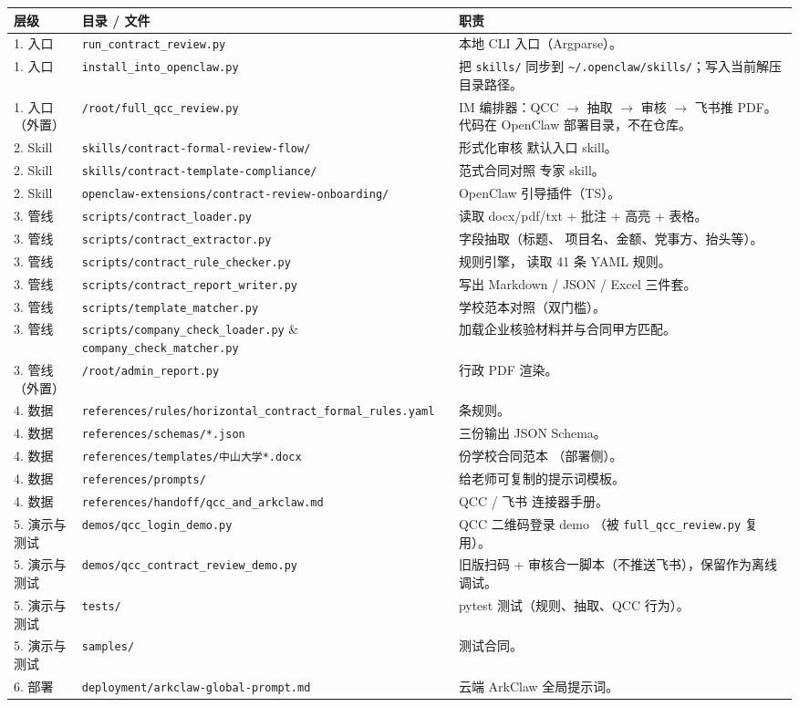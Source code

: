 \documentclass[11pt,a4paper]{article}
\newcommand{\bt}[1]{\nolinkurl{#1}}
\begin{document}
\begin{longtable}{p{2.2cm} >{\raggedright\arraybackslash}p{5.0cm}
                  >{\raggedright\arraybackslash}p{7.8cm}}
\toprule
\textbf{层级} & \textbf{目录 / 文件} & \textbf{职责} \\ \midrule
\endhead
1. 入口 & \bt{run_contract_review.py} & 本地 CLI 入口（Argparse）。 \\
1. 入口 & \bt{install_into_openclaw.py} & 把 \bt{skills/} 同步到
\bt{~/.openclaw/skills/}；写入当前解压目录路径。 \\
1. 入口（外置）& \bt{/root/full_qcc_review.py} & IM 编排器：QCC $\to$
抽取 $\to$ 审核 $\to$ 飞书推 PDF。代码在 OpenClaw 部署目录，不在仓库。 \\ \midrule
2. Skill & \bt{skills/contract-formal-review-flow/} & 形式化审核
默认入口 skill。 \\
2. Skill & \bt{skills/contract-template-compliance/} & 范式合同对照
专家 skill。 \\
2. Skill & \bt{openclaw-extensions/contract-review-onboarding/} &
OpenClaw 引导插件（TS）。 \\ \midrule
3. 管线 & \bt{scripts/contract_loader.py} & 读取 docx/pdf/txt
+ 批注 + 高亮 + 表格。 \\
3. 管线 & \bt{scripts/contract_extractor.py} & 字段抽取（标题、
项目名、金额、党事方、抬头等）。 \\
3. 管线 & \bt{scripts/contract_rule_checker.py} & 规则引擎，
读取 41 条 YAML 规则。 \\
3. 管线 & \bt{scripts/contract_report_writer.py} & 写出
Markdown / JSON / Excel 三件套。 \\
3. 管线 & \bt{scripts/template_matcher.py} & 学校范本对照（双门槛）。 \\
3. 管线 & \bt{scripts/company_check_loader.py} \& \bt{company_check_matcher.py}
& 加载企业核验材料并与合同甲方匹配。 \\
3. 管线（外置）& \bt{/root/admin_report.py} & 行政 PDF 渲染。 \\ \midrule
4. 数据 & \bt{references/rules/horizontal_contract_formal_rules.yaml}
& 41 条规则。 \\
4. 数据 & \bt{references/schemas/*.json} & 三份输出 JSON Schema。 \\
4. 数据 & \bt{references/templates/中山大学*.docx} & 6 份学校合同范本
（部署侧）。 \\
4. 数据 & \bt{references/prompts/} & 给老师可复制的提示词模板。 \\
4. 数据 & \bt{references/handoff/qcc_and_arkclaw.md} & QCC / 飞书
连接器手册。 \\ \midrule
5. 演示与测试 & \bt{demos/qcc_login_demo.py} & QCC 二维码登录 demo
（被 \bt{full_qcc_review.py} 复用）。 \\
5. 演示与测试 & \bt{demos/qcc_contract_review_demo.py} & 旧版扫码
+ 审核合一脚本（不推送飞书），保留作为离线调试。 \\
5. 演示与测试 & \bt{tests/} & pytest 测试（规则、抽取、QCC 行为）。 \\
5. 演示与测试 & \bt{samples/} & 测试合同。 \\ \midrule
6. 部署 & \bt{deployment/arkclaw-global-prompt.md} & 云端 ArkClaw
全局提示词。 \\
\bottomrule
\end{longtable}
\end{document}
